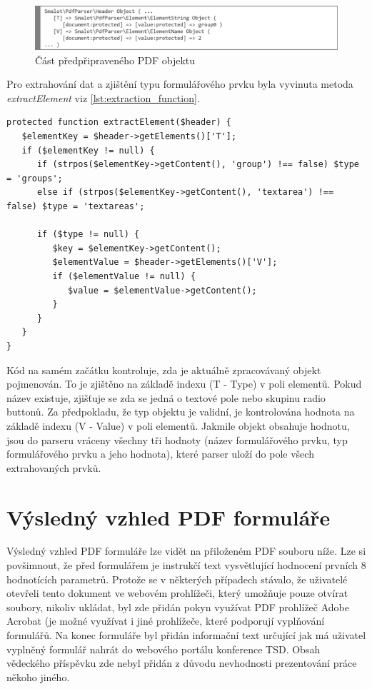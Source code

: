 \begin{figure}[h!]
\centering
\includegraphics[width=15cm]{img/parsing_object}
\caption{Část předpřipraveného PDF objektu}
\label{fig:parsing_object}
\end{figure}
\par
Pro extrahování dat a zjištění typu formulářového prvku byla vyvinuta metoda \textit{extractElement} viz \ref{lst:extraction_function}.
\begin{lstlisting}[caption = {Funkční kód pro uložení formulářových prvků z PDF objektů}, label = {lst:extraction_function}, captionpos=b]
protected function extractElement($header) {
   $elementKey = $header->getElements()['T'];                                                      
   if ($elementKey != null) {
      if (strpos($elementKey->getContent(), 'group') !== false) $type = 'groups';
      else if (strpos($elementKey->getContent(), 'textarea') !== false) $type = 'textareas';
                       
      if ($type != null) {
         $key = $elementKey->getContent();
         $elementValue = $header->getElements()['V'];
         if ($elementValue != null) {
            $value = $elementValue->getContent();
         }    
      }
   }
}
\end{lstlisting}
Kód na samém začátku kontroluje, zda je aktuálně zpracovávaný objekt pojmenován. To je zjištěno na základě indexu  (T - Type) v poli elementů. Pokud název existuje, zjišťuje se zda se jedná o textové pole nebo skupinu radio buttonů. Za předpokladu, že typ objektu je validní, je kontrolována hodnota na základě indexu  (V - Value) v poli elementů. Jakmile objekt obsahuje hodnotu, jsou do parseru vráceny všechny tři hodnoty (název formulářového prvku, typ formulářového prvku a jeho hodnota), které parser uloží do pole všech extrahovaných prvků.

\section{Výsledný vzhled PDF formuláře}
Výsledný vzhled PDF formuláře lze vidět na přiloženém PDF souboru níže. Lze si povšimnout, že před formulářem je instrukčí text vysvětlující hodnocení prvních 8 hodnotících parametrů. Protože se v některých případech stávalo, že uživatelé otevřeli tento dokument ve webovém prohlížeči, který umožňuje pouze otvírat soubory, nikoliv ukládat, byl zde přidán pokyn využívat PDF prohlížeč Adobe Acrobat (je možné využívat i jiné prohlížeče, které podporují vyplňování formulářů. Na konec formuláře byl přidán informační text určující jak má uživatel vyplněný formulář nahrát do webového portálu konference TSD. Obsah vědeckého příspěvku zde nebyl přidán z důvodu nevhodnosti prezentování práce někoho jiného.
\newpage

\newpage


